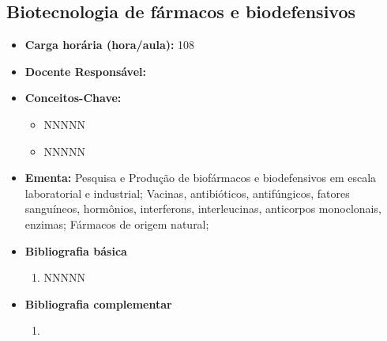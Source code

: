 \documentclass[11pt,fleqn]{book} %
\begin{document}
\subsection{Biotecnologia de fármacos e biodefensivos}\label{disc:biotecFarmacos}
\begin{itemize}
	\item \textbf{Carga horária (hora/aula):} 108
	\item \textbf{Docente Responsável:}
	\item \textbf{Conceitos-Chave:}
	\begin{itemize}
		\item NNNNN
		\item NNNNN
	\end{itemize}
	\item \textbf{Ementa:} Pesquisa e Produção de biofármacos e biodefensivos em escala laboratorial e industrial;
	Vacinas, antibióticos, antifúngicos, fatores sanguíneos, hormônios, interferons, interleucinas,
	anticorpos monoclonais, enzimas; 
	Fármacos de origem natural;
	\item \textbf{Bibliografia básica}
	\begin{enumerate}
		\item NNNNN
	\end{enumerate}
	\item \textbf{Bibliografia complementar}
	\begin{enumerate}
		\item 
	\end{enumerate}	
\end{itemize}


\newpage
\end{document}

